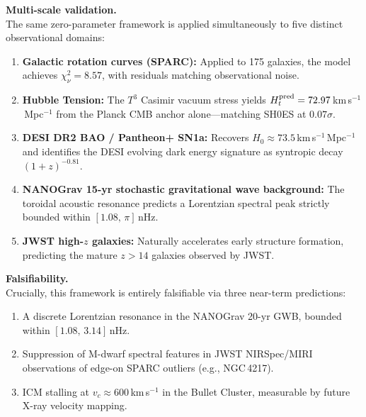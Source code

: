 \documentclass[10pt, a4paper]{article}
\begin{document}
\vspace{0.4em}
\noindent\textbf{Multi-scale validation.} \\
The same zero-parameter framework is applied simultaneously to five distinct observational domains:
\begin{enumerate}[noitemsep,topsep=0pt,parsep=0pt,partopsep=0pt]
  \item \textbf{Galactic rotation curves (SPARC):} Applied to 175 galaxies, the model achieves $\chi^2_\nu = 8.57$, with residuals matching observational noise.
  \item \textbf{Hubble Tension:} The $T^3$ Casimir vacuum stress yields $H_t^{\rm pred} = 72.97$\,km\,s$^{-1}$\,Mpc$^{-1}$ from the Planck CMB anchor alone---matching SH0ES at $0.07\sigma$.
  \item \textbf{DESI DR2 BAO / Pantheon+ SN1a:} Recovers $H_0 \approx 73.5$\,km\,s$^{-1}$\,Mpc$^{-1}$ and identifies the DESI evolving dark energy signature as syntropic decay $(1+z)^{-0.81}$.
  \item \textbf{NANOGrav 15-yr stochastic gravitational wave background:} The toroidal acoustic resonance predicts a Lorentzian spectral peak strictly bounded within $[1.08,\,\pi]$\,nHz.
  \item \textbf{JWST high-$z$ galaxies:} Naturally accelerates early structure formation, predicting the mature $z > 14$ galaxies observed by JWST.
\end{enumerate}

\vspace{0.4em}
\noindent\textbf{Falsifiability.} \\
Crucially, this framework is entirely falsifiable via three near-term predictions:
\begin{enumerate}[noitemsep,topsep=0pt,parsep=0pt,partopsep=0pt]
  \item A discrete Lorentzian resonance in the NANOGrav 20-yr GWB, bounded within $[1.08,\,3.14]$\,nHz.
  \item Suppression of M-dwarf spectral features in JWST NIRSpec/MIRI observations of edge-on SPARC outliers (e.g., NGC\,4217).
  \item ICM stalling at $v_c \approx 600$\,km\,s$^{-1}$ in the Bullet Cluster, measurable by future X-ray velocity mapping.
\end{enumerate}
\end{document}
